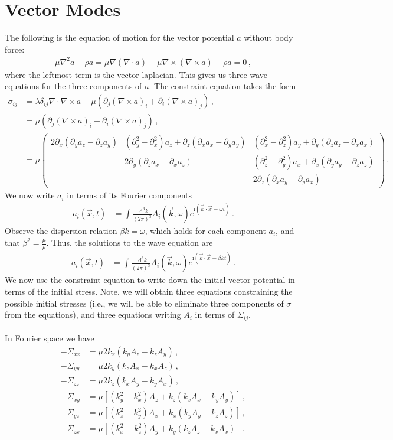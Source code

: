 \documentclass{article}
\newcommand*\diff{\mathop{}\!\mathrm{d}}
\newcommand*\te[1]{\text{#1}}
\newcommand*\ps[1]{\left[#1\right]}
\newcommand*\f[2]{\frac{#1}{#2}}
\newcommand*\mat[2]{\left(\begin{array}{#1}#2\end{array}\right)}
\newcommand*\I{\te{i}}
\begin{document}
\section{Vector Modes}
The following is the equation of motion for the vector potential $a$ without body force:
\begin{align}
\mu\nabla^2a-\rho\ddot a=\mu\nabla(\nabla\cdot a)-\mu\nabla\times(\nabla\times a)-\rho\ddot a=0\,,
\end{align}
where the leftmost term is the vector laplacian. This gives us three wave equations for the three components of $a$. The constraint equation takes the form
\begin{align}
\sigma_{ij}&=\lambda\delta_{ij}\nabla\cdot \nabla\times a+\mu(\partial_j (\nabla\times a)_i+\partial_i (\nabla\times a)_j)\,,\\
&=\mu(\partial_j (\nabla\times a)_i+\partial_i (\nabla\times a)_j)\,,\\
&=\mu\mat{ccc}{2\partial_x(\partial_ya_z-\partial_za_y)&(\partial_y^2-\partial_x^2)a_z+\partial_z(\partial_x a_x-\partial_y a_y)&(\partial_x^2-\partial_z^2)a_y+\partial_y(\partial_z a_z-\partial_x a_x)\\
&2\partial_y(\partial_z a_x-\partial_x a_z)&(\partial_z^2-\partial_y^2)a_x+\partial_x(\partial_ya_y-\partial_za_z)\\
&&2\partial_z(\partial_xa_y-\partial_ya_x)}\,.
\end{align}
We now write $a_i$ in terms of its Fourier components
\begin{align}
a_i(\vec x,t)&=\int\f{\diff^3k}{(2\pi)^3}A_i(\vec k,\omega)e^{\I(\vec k\cdot\vec x-\omega t)}\,.
\end{align}
Observe the dispersion relation $\beta k=\omega$, which holds for each component $a_i$, and that $\beta^2=\f\mu\rho$. Thus, the solutions to the wave equation are
\begin{align}
a_i(\vec x,t)&=\int\f{\diff^3k}{(2\pi)^3}A_i(\vec k,\omega)e^{\I(\vec k\cdot\vec x-\beta k t)}\,.
\end{align}
We now use the constraint equation to write down the initial vector potential in terms of the initial stress. Note, we will obtain three equations constraining the possible initial stresses (i.e., we will be able to eliminate three components of $\sigma$ from the equations), and three equations writing $A_i$ in terms of $\Sigma_{ij}$.
\\\\
In Fourier space we have
\begin{align}
-\Sigma_{xx}&=\mu2k_x(k_y A_z-k_z A_y)\,,\\
-\Sigma_{yy}&=\mu2k_y(k_z A_x-k_x A_z)\,,\\
-\Sigma_{zz}&=\mu2k_z(k_x A_y-k_y A_x)\,,\\
-\Sigma_{xy}&=\mu\ps{(k_y^2-k_x^2) A_z+k_z(k_x A_x-k_y A_y)}\,,\\
-\Sigma_{yz}&=\mu\ps{(k_z^2-k_y^2) A_x+k_x(k_y A_y-k_z A_z)}\,,\\
-\Sigma_{zx}&=\mu\ps{(k_x^2-k_z^2) A_y+k_y(k_z A_z-k_x A_x)}\,.
\end{align}
\end{document}
